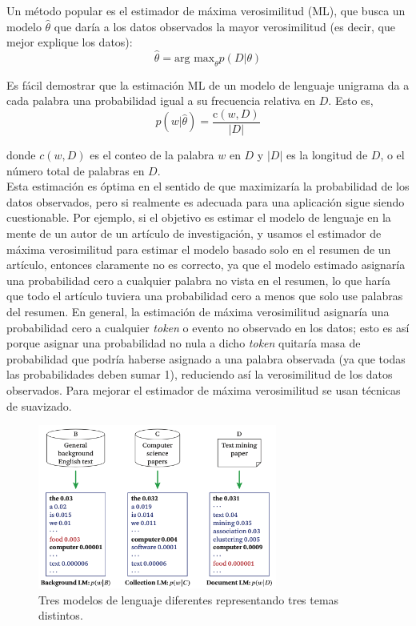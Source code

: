 Un método popular es el estimador de máxima verosimilitud (ML), que busca un modelo $\hat{\theta}$ que daría a los datos observados la mayor verosimilitud (es decir, que mejor explique los datos):
\begin{equation}
\hat{\theta} = \text{arg max}_{\theta} p(D | \theta)
\end{equation}

Es fácil demostrar que la estimación ML de un modelo de lenguaje unigrama da a cada palabra una probabilidad igual a su frecuencia relativa en $D$. Esto es,
\begin{equation}
p(w | \hat{\theta}) = \frac{\text{c}(w, D)}{|D|}
\end{equation}

donde $c(w, D)$ es el conteo de la palabra $w$ en $D$ y $|D|$ es la longitud de $D$, o el número total de palabras en $D$. \\

Esta estimación es óptima en el sentido de que maximizaría la probabilidad de los datos observados, pero si realmente es adecuada para una aplicación sigue siendo cuestionable. Por ejemplo, si el objetivo es estimar el modelo de lenguaje en la mente de un autor de un artículo de investigación, y usamos el estimador de máxima verosimilitud para estimar el modelo basado solo en el resumen de un artículo, entonces claramente no es correcto, ya que el modelo estimado asignaría una probabilidad cero a cualquier palabra no vista en el resumen, lo que haría que todo el artículo tuviera una probabilidad cero a menos que solo use palabras del resumen. En general, la estimación de máxima verosimilitud asignaría una probabilidad cero a cualquier \textit{token} o evento no observado en los datos; esto es así porque asignar una probabilidad no nula a dicho \textit{token} quitaría masa de probabilidad que podría haberse asignado a una palabra observada (ya que todas las probabilidades deben sumar 1), reduciendo así la verosimilitud de los datos observados. Para mejorar el estimador de máxima verosimilitud se usan técnicas de suavizado. \\

\begin{figure}[h]
\centering
\includegraphics[width=0.7\textwidth]{fotos/10.png}
\caption{Tres modelos de lenguaje diferentes representando tres temas distintos.}
\label{fig:3.6}
\end{figure}

